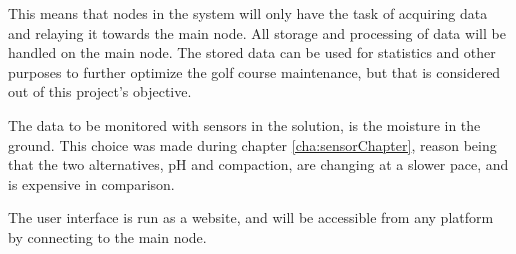 This means that nodes in the system will only have the task of acquiring data and relaying it towards the main node. All storage and processing of data will be handled on the main node.
The stored data can be used for statistics and other purposes to further optimize the golf course maintenance, but that is considered out of this project's objective.

The data to be monitored with sensors in the solution, is the moisture in the ground. This choice was made during chapter \ref{cha:sensorChapter}, reason being that the two alternatives, pH and compaction, are changing at a slower pace, and is expensive in comparison.


The user interface is run as a website, and will be accessible from any platform by connecting to the main node.

